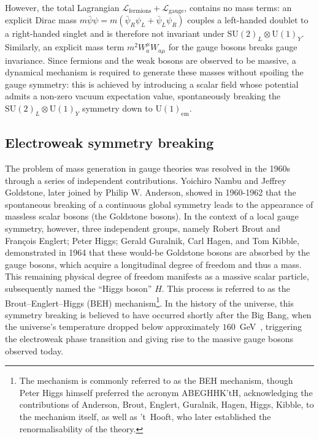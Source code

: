 However, the total Lagrangian $\mathcal{L}_\mathrm{fermions}+\mathcal{L}_\mathrm{gauge}$, contains no mass terms: an explicit Dirac mass $m\bar{\psi}\psi = m(\bar{\psi}_R\psi_L + \bar{\psi}_L\psi_R)$ couples a left-handed doublet to a right-handed singlet and is therefore not invariant under $\mathrm{SU}(2)_L \otimes \mathrm{U}(1)_Y$. Similarly, an explicit mass term $m^2 W^\mu_a W_{a\mu}$ for the gauge bosons breaks gauge invariance. Since fermions and the weak bosons are observed to be massive, a dynamical mechanism is required to generate these masses without spoiling the gauge symmetry: this is achieved by introducing a scalar field whose potential admits a non-zero vacuum expectation value, spontaneously breaking the $\mathrm{SU}(2)_L \otimes \mathrm{U}(1)_Y$ symmetry down to $\mathrm{U}(1)_{\mathrm{em}}$.


\subsection{Electroweak symmetry breaking}
\label{subsection:BEH}

The problem of mass generation in gauge theories was resolved in the 1960s through a series of independent contributions. Yoichiro Nambu and Jeffrey Goldstone, later joined by Philip W. Anderson, showed in 1960-1962 that the spontaneous breaking of a continuous global symmetry leads to the appearance of massless scalar bosons (the Goldstone bosons). In the context of a local gauge symmetry, however, three independent groups, namely Robert Brout and François Englert; Peter Higgs; Gerald Guralnik, Carl Hagen, and Tom Kibble, demonstrated in 1964 that these would-be Goldstone bosons are absorbed by the gauge bosons, which acquire a longitudinal degree of freedom and thus a mass. This remaining physical degree of freedom manifests as a massive scalar particle, subsequently named the ``Higgs boson'' $H$. This process is referred to as the Brout--Englert--Higgs (BEH) mechanism\footnote{The mechanism is commonly referred to as the BEH mechanism, though Peter Higgs himself preferred the acronym ABEGHHK'tH, acknowledging the contributions of Anderson, Brout, Englert, Guralnik, Hagen, Higgs, Kibble, to the mechanism itself, as well as 't~Hooft, who later established the renormalisability of the theory.}. In the history of the universe, this symmetry breaking is believed to have occurred shortly after the Big Bang, when the universe's temperature dropped below approximately $160$~GeV~\cite{ElectroWeak_Temperature}, triggering the electroweak phase transition and giving rise to the massive gauge bosons observed today.

